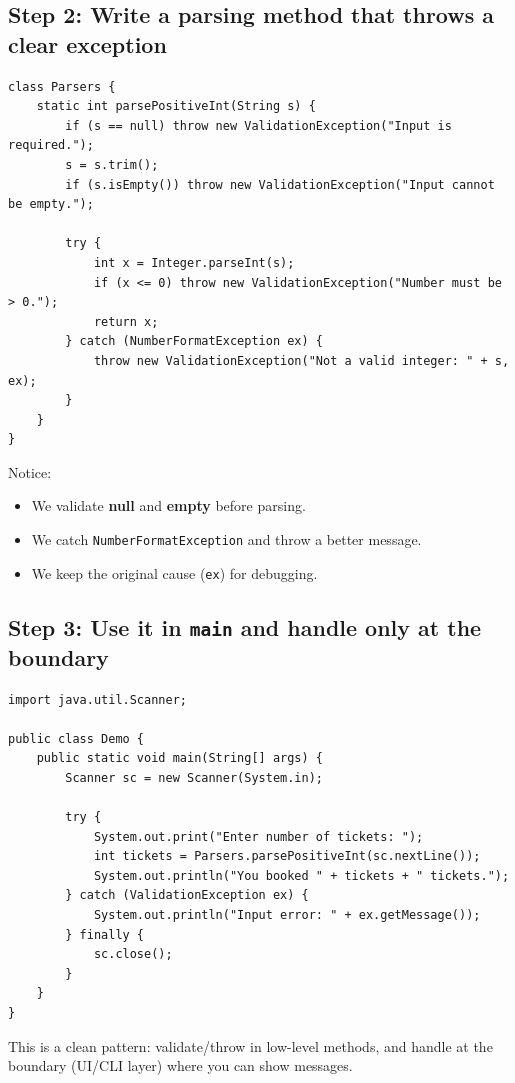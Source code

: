 \documentclass[11pt]{article}
\begin{document}
\subsection*{Step 2: Write a parsing method that throws a clear exception}
\begin{lstlisting}
class Parsers {
    static int parsePositiveInt(String s) {
        if (s == null) throw new ValidationException("Input is required.");
        s = s.trim();
        if (s.isEmpty()) throw new ValidationException("Input cannot be empty.");

        try {
            int x = Integer.parseInt(s);
            if (x <= 0) throw new ValidationException("Number must be > 0.");
            return x;
        } catch (NumberFormatException ex) {
            throw new ValidationException("Not a valid integer: " + s, ex);
        }
    }
}
\end{lstlisting}
Notice:
\begin{itemize}
  \item We validate \textbf{null} and \textbf{empty} before parsing.
  \item We catch \texttt{NumberFormatException} and throw a better message.
  \item We keep the original cause (\texttt{ex}) for debugging.
\end{itemize}

\subsection*{Step 3: Use it in \texttt{main} and handle only at the boundary}
\begin{lstlisting}
import java.util.Scanner;

public class Demo {
    public static void main(String[] args) {
        Scanner sc = new Scanner(System.in);

        try {
            System.out.print("Enter number of tickets: ");
            int tickets = Parsers.parsePositiveInt(sc.nextLine());
            System.out.println("You booked " + tickets + " tickets.");
        } catch (ValidationException ex) {
            System.out.println("Input error: " + ex.getMessage());
        } finally {
            sc.close();
        }
    }
}
\end{lstlisting}
This is a clean pattern: validate/throw in low-level methods, and handle at the boundary (UI/CLI layer) where you can show messages.
\end{document}
